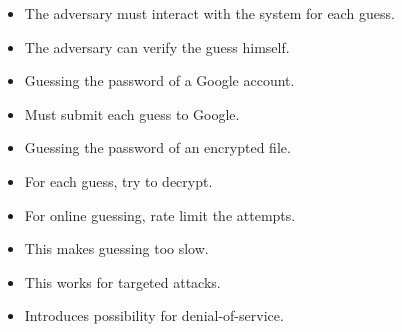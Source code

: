 \begin{frame}
  \begin{definition}[Online]
    \begin{itemize}
      \item The adversary must interact with the system for each guess.
    \end{itemize}
  \end{definition}

  \pause

  \begin{definition}[Offline]
    \begin{itemize}
      \item The adversary can verify the guess himself.
    \end{itemize}
  \end{definition}
\end{frame}

\begin{frame}
  \begin{example}[Online]
    \begin{itemize}
      \item Guessing the password of a Google account.
      \item Must submit each guess to Google.
    \end{itemize}
  \end{example}

  \pause

  \begin{example}[Offline]
    \begin{itemize}
      \item Guessing the password of an encrypted file.
      \item For each guess, try to decrypt.
    \end{itemize}
  \end{example}
\end{frame}

\begin{frame}
  \begin{solution}
    \begin{itemize}
      \item For online guessing, rate limit the attempts.
      \item This makes guessing too slow.
    \end{itemize}
  \end{solution}

  \pause

  \begin{remark}
    \begin{itemize}
      \item This works for targeted attacks.
      \item Introduces possibility for denial-of-service.
    \end{itemize}
  \end{remark}
\end{frame}

